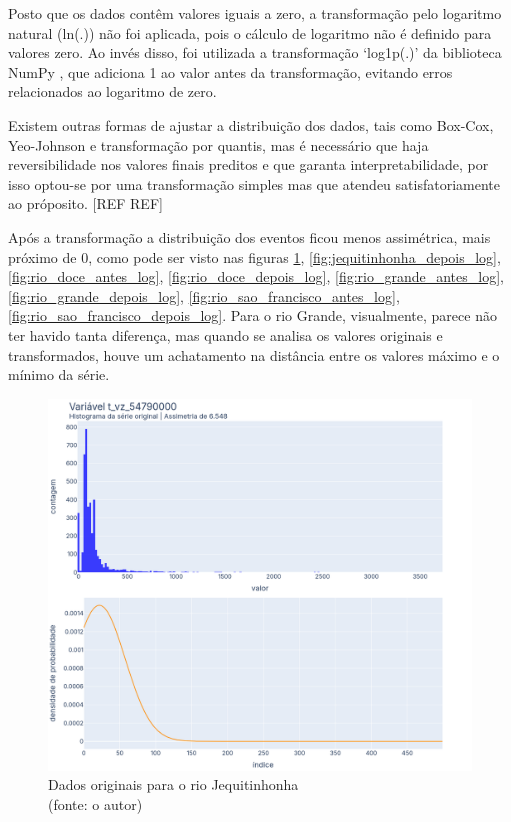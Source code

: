 
Posto que os dados contêm valores iguais a zero, a transformação pelo logaritmo natural (ln(.)) não foi aplicada, pois o cálculo de logaritmo não é definido para valores zero. Ao invés disso, foi utilizada a transformação `log1p(.)' da biblioteca NumPy \cite{numpyref}, que adiciona 1 ao valor antes da transformação, evitando erros relacionados ao logaritmo de zero.

Existem outras formas de ajustar a distribuição dos dados, tais como Box-Cox, Yeo-Johnson e transformação por quantis, mas é necessário que haja reversibilidade nos valores finais preditos e que garanta interpretabilidade, por isso optou-se por uma transformação simples mas que atendeu satisfatoriamente ao próposito. [REF REF]

Após a transformação a distribuição dos eventos ficou menos assimétrica, mais próximo de 0, como pode ser visto nas figuras \ref{fig:jequitinhonha_antes_log}, \ref{fig:jequitinhonha_depois_log}, \ref{fig:rio_doce_antes_log}, \ref{fig:rio_doce_depois_log}, \ref{fig:rio_grande_antes_log}, \ref{fig:rio_grande_depois_log}, \ref{fig:rio_sao_francisco_antes_log}, \ref{fig:rio_sao_francisco_depois_log}. Para o rio Grande, visualmente, parece não ter havido tanta diferença, mas quando se analisa os valores originais e transformados, houve um achatamento na distância entre os valores máximo e o mínimo da série.

\begin{figure}[!h]
	\centering
	\includegraphics[scale=0.8]{Figuras/jequiti/jequitinhonha_antes_log.png}
	\caption{Dados originais para o rio Jequitinhonha\\(fonte: o autor)}
	\label{fig:jequitinhonha_antes_log}
\end{figure}


